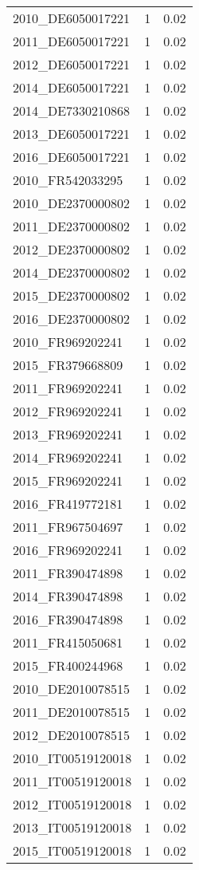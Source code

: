 \begin{table*}[htbp]
\begin{tabular}{lrr}
2010_DE6050017221 & 1 & 0.02 \\
2011_DE6050017221 & 1 & 0.02 \\
2012_DE6050017221 & 1 & 0.02 \\
2014_DE6050017221 & 1 & 0.02 \\
2014_DE7330210868 & 1 & 0.02 \\
2013_DE6050017221 & 1 & 0.02 \\
2016_DE6050017221 & 1 & 0.02 \\
2010_FR542033295 & 1 & 0.02 \\
2010_DE2370000802 & 1 & 0.02 \\
2011_DE2370000802 & 1 & 0.02 \\
2012_DE2370000802 & 1 & 0.02 \\
2014_DE2370000802 & 1 & 0.02 \\
2015_DE2370000802 & 1 & 0.02 \\
2016_DE2370000802 & 1 & 0.02 \\
2010_FR969202241 & 1 & 0.02 \\
2015_FR379668809 & 1 & 0.02 \\
2011_FR969202241 & 1 & 0.02 \\
2012_FR969202241 & 1 & 0.02 \\
2013_FR969202241 & 1 & 0.02 \\
2014_FR969202241 & 1 & 0.02 \\
2015_FR969202241 & 1 & 0.02 \\
2016_FR419772181 & 1 & 0.02 \\
2011_FR967504697 & 1 & 0.02 \\
2016_FR969202241 & 1 & 0.02 \\
2011_FR390474898 & 1 & 0.02 \\
2014_FR390474898 & 1 & 0.02 \\
2016_FR390474898 & 1 & 0.02 \\
2011_FR415050681 & 1 & 0.02 \\
2015_FR400244968 & 1 & 0.02 \\
2010_DE2010078515 & 1 & 0.02 \\
2011_DE2010078515 & 1 & 0.02 \\
2012_DE2010078515 & 1 & 0.02 \\
2010_IT00519120018 & 1 & 0.02 \\
2011_IT00519120018 & 1 & 0.02 \\
2012_IT00519120018 & 1 & 0.02 \\
2013_IT00519120018 & 1 & 0.02 \\
2015_IT00519120018 & 1 & 0.02 \\

\end{tabular}
\end{table*}
